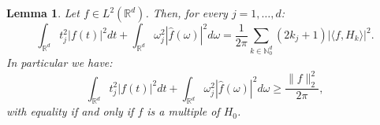 \documentclass[corpo=11pt, stile=classica, tipotesi=custom,
greek, evenboxes, english]{toptesi}
\numberwithin{equation}{chapter}
\newtheorem{lem}[teo]{Lemma}
\theoremstyle{definition}
\theoremstyle{remark}
\newcommand{\R}{\mathbb{R}} %
\newcommand{\N}{\mathbb{N}} %
\begin{document}
\begin{lem}\label{Heisenberg's uncertainty principle lemma d dimensions}
	Let $f \in L^2(\R^d)$. Then, for every $j = 1,\ldots,d$:
	\begin{equation}\label{Heisenberg's uncertainty principle lemma d dimensions formula}
		\int_{\R^d} t_j^2 |f(t)|^2 dt + \int_{\R^d} \omega_j^2 |\hat{f}(\omega)|^2d\omega = \dfrac{1}{2\pi} \sum_{k \in \N_0^d} (2k_j + 1) |\langle f, H_k \rangle|^2.
	\end{equation}
	In particular we have:
	\begin{equation}\label{Heisenberg's uncertainty principle lemma d dimensions inequality}
		\int_{\R^d} t_j^2 |f(t)|^2dt + \int_{\R^d} \omega_j^2 |\hat{f}(\omega)|^2d\omega \geq \dfrac{\|f\|_2^2}{2\pi},
	\end{equation}
	with equality if and only if $f$ is a multiple of $H_0$.
\end{lem}
\end{document}
